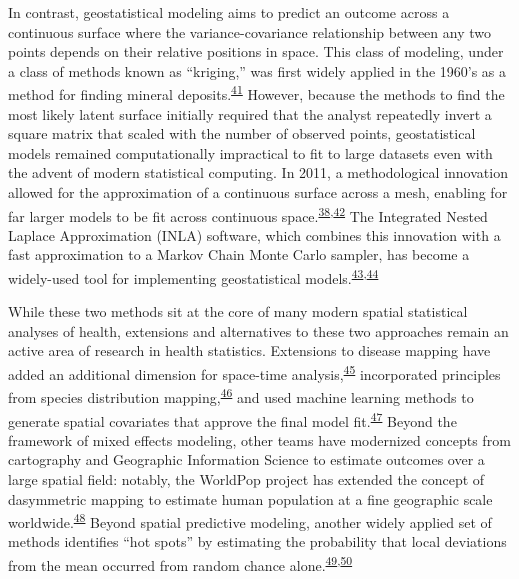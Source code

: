 \documentclass[
]{article}
\begin{document}
In contrast, geostatistical modeling aims to predict an outcome across a continuous surface where the variance-covariance relationship between any two points depends on their relative positions in space. This class of modeling, under a class of methods known as ``kriging,'' was first widely applied in the 1960's as a method for finding mineral deposits.\textsuperscript{\protect\hyperlink{ref-Oliver2010}{41}} However, because the methods to find the most likely latent surface initially required that the analyst repeatedly invert a square matrix that scaled with the number of observed points, geostatistical models remained computationally impractical to fit to large datasets even with the advent of modern statistical computing. In 2011, a methodological innovation allowed for the approximation of a continuous surface across a mesh, enabling for far larger models to be fit across continuous space.\textsuperscript{\protect\hyperlink{ref-Lindgren2011}{38},\protect\hyperlink{ref-Miller2020}{42}} The Integrated Nested Laplace Approximation (INLA) software, which combines this innovation with a fast approximation to a Markov Chain Monte Carlo sampler, has become a widely-used tool for implementing geostatistical models.\textsuperscript{\protect\hyperlink{ref-Rue2009}{43},\protect\hyperlink{ref-Krainski2018}{44}}

While these two methods sit at the core of many modern spatial statistical analyses of health, extensions and alternatives to these two approaches remain an active area of research in health statistics. Extensions to disease mapping have added an additional dimension for space-time analysis,\textsuperscript{\protect\hyperlink{ref-Mercer2015}{45}} incorporated principles from species distribution mapping,\textsuperscript{\protect\hyperlink{ref-Hay2013}{46}} and used machine learning methods to generate spatial covariates that approve the final model fit.\textsuperscript{\protect\hyperlink{ref-Bhatt2017}{47}} Beyond the framework of mixed effects modeling, other teams have modernized concepts from cartography and Geographic Information Science to estimate outcomes over a large spatial field: notably, the WorldPop project has extended the concept of dasymmetric mapping to estimate human population at a fine geographic scale worldwide.\textsuperscript{\protect\hyperlink{ref-Tatem2017}{48}} Beyond spatial predictive modeling, another widely applied set of methods identifies ``hot spots'' by estimating the probability that local deviations from the mean occurred from random chance alone.\textsuperscript{\protect\hyperlink{ref-Kulldorff1997}{49},\protect\hyperlink{ref-Banerjee2014}{50}}
\end{document}
